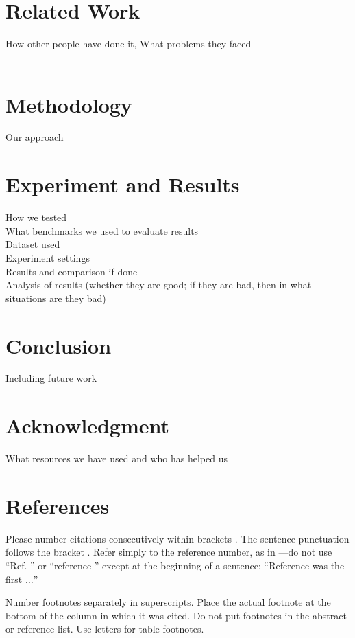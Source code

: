 \documentclass[conference]{IEEEtran}
\begin{document}
\section{Related Work}
How other people have done it, What problems they faced\\\\

\section{Methodology}
Our approach

\section{Experiment and Results}
How we tested\\
What benchmarks we used to evaluate results\\
Dataset used\\
Experiment settings\\
Results and comparison if done\\
Analysis of results (whether they are good; if they are bad, then in what situations are they bad)

\section{Conclusion}
Including future work

\section*{Acknowledgment}
What resources we have used and who has helped us

\section*{References}

Please number citations consecutively within brackets \cite{b1}. The 
sentence punctuation follows the bracket \cite{b2}. Refer simply to the reference 
number, as in \cite{b3}---do not use ``Ref. \cite{b3}'' or ``reference \cite{b3}'' except at 
the beginning of a sentence: ``Reference \cite{b3} was the first $\ldots$''

Number footnotes separately in superscripts. Place the actual footnote at 
the bottom of the column in which it was cited. Do not put footnotes in the 
abstract or reference list. Use letters for table footnotes.
\end{document}

